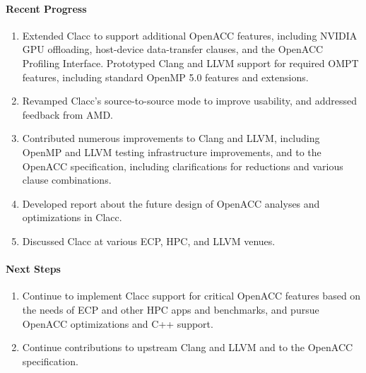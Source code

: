 \paragraph{Recent Progress}

\begin{enumerate}
\item
  Extended Clacc to support additional OpenACC features, including
  NVIDIA GPU offloading, host-device data-transfer clauses, and the
  OpenACC Profiling Interface.  Prototyped Clang and LLVM support for
  required OMPT features, including standard OpenMP 5.0 features and
  extensions.
\item
  Revamped Clacc's source-to-source mode to improve usability, and
  addressed feedback from AMD.
\item
  Contributed numerous improvements to Clang and LLVM, including
  OpenMP and LLVM testing infrastructure improvements, and to the
  OpenACC specification, including clarifications for reductions and
  various clause combinations.
\item
  Developed report about the future design of OpenACC analyses and
  optimizations in Clacc.
\item
  Discussed Clacc at various ECP, HPC, and LLVM venues.
\end{enumerate}


\paragraph{Next Steps}

\begin{enumerate}
\item
  Continue to implement Clacc support for critical OpenACC features
  based on the needs of ECP and other HPC apps and benchmarks, and
  pursue OpenACC optimizations and C++ support.
\item
  Continue contributions to upstream Clang and LLVM and to the OpenACC
  specification.
\end{enumerate}
